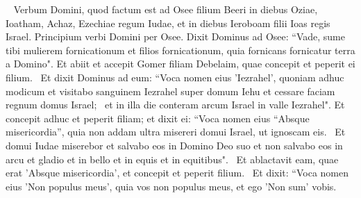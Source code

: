 
\begin{biblechapter}   
\verse Verbum Domini, quod factum est ad Osee filium Beeri in diebus Oziae, Ioatham, Achaz, Ezechiae regum Iudae, et in diebus Ieroboam filii Ioas regis Israel. 
\verse Principium verbi Domini per Osee. Dixit Dominus ad Osee: “Vade, sume tibi mulierem fornicationum et filios fornicationum, quia fornicans fornicatur terra a Domino". 
\verse Et abiit et accepit Gomer filiam Debelaim, quae concepit et peperit ei filium.  
\verse Et dixit Dominus ad eum: “Voca nomen eius 'Iezrahel', quoniam adhuc modicum et visitabo sanguinem Iezrahel super domum Iehu et cessare faciam regnum domus Israel;  
\verse et in illa die conteram arcum Israel in valle Iezrahel". 
\verse Et concepit adhuc et peperit filiam; et dixit ei: “Voca nomen eius “Absque misericordia”, quia non addam ultra misereri domui Israel, ut ignoscam eis.  
\verse Et domui Iudae miserebor et salvabo eos in Domino Deo suo et non salvabo eos in arcu et gladio et in bello et in equis et in equitibus".  
\verse Et ablactavit eam, quae erat 'Absque misericordia', et concepit et peperit filium.  
\verse Et dixit: “Voca nomen eius 'Non populus meus', quia vos non populus meus, et ego 'Non sum' vobis. 
\end{biblechapter}

